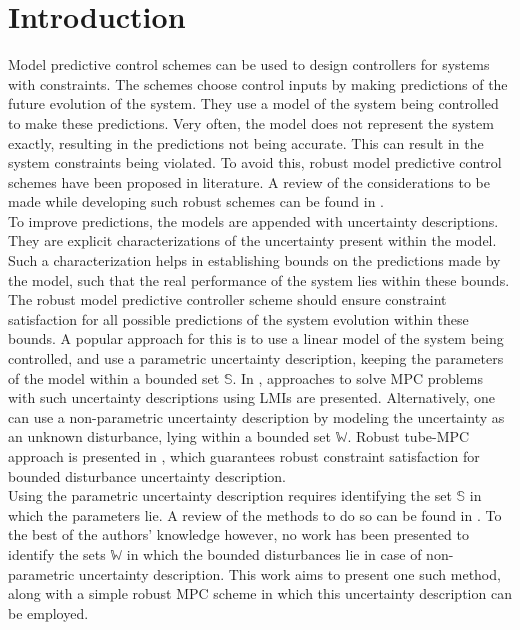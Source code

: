 \documentclass[letterpaper, 10 pt, conference]{ieeeconf}  %
\begin{document}
\section{Introduction}
Model predictive control schemes can be used to design controllers for systems with constraints. The schemes choose control inputs by making predictions of the future evolution of the system. They use a model of the system being controlled to make these predictions. Very often, the model does not represent the system exactly, resulting in the predictions not being accurate. This can result in the system constraints being violated. To avoid this, robust model predictive control schemes have been proposed in literature. A review of the considerations to be made while developing such robust schemes can be found in \cite{10.1007/BFb0109870}.
 \\ \indent
 To improve predictions, the models are appended with uncertainty descriptions.
 They are explicit characterizations of the uncertainty present within the model. Such a characterization helps in establishing bounds on the predictions made by the model, such that the real performance of the system lies within these bounds. The robust model predictive controller scheme should ensure constraint satisfaction for all possible predictions of the system evolution within these bounds. A popular approach for this is to use a linear model of the system being controlled, and use a parametric uncertainty description, keeping the parameters of the model within a bounded set $\mathbb{S}$. In \cite{KOTHARE19961361}, approaches to solve MPC problems with such uncertainty descriptions using LMIs are presented. Alternatively, one can use a non-parametric uncertainty description by modeling the uncertainty as an unknown disturbance, lying within a bounded set $\mathbb{W}$. Robust tube-MPC approach is presented in \cite{MAYNE2005219}, which guarantees robust constraint satisfaction for bounded disturbance uncertainty description.
 \\
 \indent
 Using the parametric uncertainty description requires identifying the set $\mathbb{S}$ in which the parameters lie. A review of the methods to do so can be found in \cite{WALTER1990449}. To the best of the authors' knowledge however, no work has been presented to identify the sets $\mathbb{W}$ in which the bounded disturbances lie in case of non-parametric uncertainty description. This work aims to present one such method, along with a simple robust MPC scheme in which this uncertainty description can be employed. 
 \\
\end{document}
